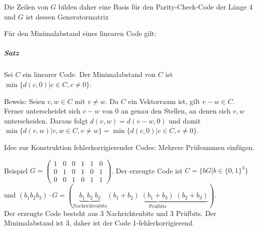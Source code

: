 \documentclass[a4paper]{scrartcl}
\begin{document}
Die Zeilen von $G$ bilden daher eine Basis für den Parity-Check-Code der Länge 4 und $G$ ist dessen Generatormatrix

Für den Minimalabstand eines linearen Code gilt:

\subparagraph{Satz} Sei $C$ ein linearer Code. Der Minimalabstand von $C$ ist $\min{\{d(c,0) | c \in C, c \neq 0\}}$.

Beweis: Seien $v,w \in C$ mit $v \neq w$. Da $C$ ein Vektorraum ist, gilt $v-w \in C$. Ferner unterscheidet sich $v-w$ von $0$ an genau den Stellen, an denen sich $v,w$ unterscheiden. Daraus folgt $d(v,w) = d(v-w,0)$ und damit $\min{\{ d(v,w) | v,w \in C, v \neq w \}} = \min{\{ d(c,0) | c \in C, c \neq 0\}}$.

Idee zur Konstruktion fehlerkorrigierender Codes: Mehrere Prüfsummen einfügen.

Beispiel $G= \begin{pmatrix}
1 & 0 & 0 & 1 & 1 & 0\\
0 & 1 & 0 & 1 & 0 & 1\\
0 & 0 & 1 & 0 & 1 & 1 \end{pmatrix}$.
Der erzeugte Code ist $C=\{ bG | b \in \{0,1\}^3 \}$ und $(b_1 b_2 b_3) \cdot G = (\underbrace{b_1 \; b_2 \; b_3}_{\text{Nachrichtenbits}} \underbrace{(b_1+b_2) \; (b_1+b_3) \;  (b_2+b_3)}_{\text{Prüfbits}})$.\\
Der erzeugte Code besteht aus 3 Nachrichtenbits und 3 Prüfbits. Der Minimalabstand ist 3, daher ist der Code 1-fehlerkorrigierend.
\end{document}
